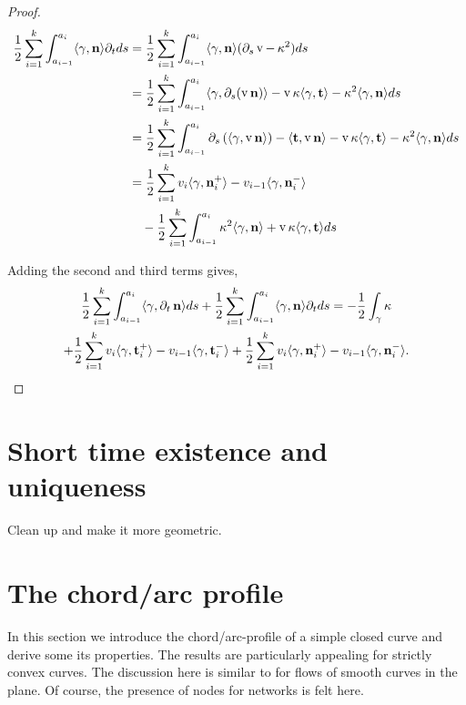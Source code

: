 \documentclass[11pt]{amsart}
\DeclareMathOperator{\tangspeed}{v}
\begin{document}
\begin{proof}
\[
\begin{split}
\frac{1}{2} \sum_{i=1}^k \int_{a_{i-1}}^{a_i} \ip{\gamma}{\nor} \partial_t ds &= \frac{1}{2} \sum_{i=1}^k \int_{a_{i-1}}^{a_i} \ip{\gamma}{\nor} (\partial_s \tangspeed - \curvecurv^2) ds \\
&= \frac{1}{2} \sum_{i=1}^k \int_{a_{i-1}}^{a_i} \ip{\gamma}{\partial_s (\tangspeed\nor)} - \tangspeed \curvecurv \ip{\gamma}{\tang} - \curvecurv^2 \ip{\gamma}{\nor} ds \\
&= \frac{1}{2} \sum_{i=1}^k \int_{a_{i-1}}^{a_i} \partial_s\left(\ip{\gamma}{\tangspeed\nor}\right) - \ip{\tang}{\tangspeed \nor} - \tangspeed \curvecurv \ip{\gamma}{\tang} - \curvecurv^2 \ip{\gamma}{\nor} ds \\
&= \frac{1}{2} \sum_{i=1}^k v_i \ip{\gamma}{\nor_i^+} - v_{i-1} \ip{\gamma}{\nor_i^-} \\
&\quad - \frac{1}{2} \sum_{i=1}^k \int_{a_{i-1}}^{a_i} \curvecurv^2 \ip{\gamma}{\nor} + \tangspeed \curvecurv \ip{\gamma}{\tang } ds
\end{split}
\]

Adding the second and third terms gives,
\begin{multline*}
\frac{1}{2} \sum_{i=1}^k \int_{a_{i-1}}^{a_i} \langle{\gamma},{\partial_t \operatorname{\mathbf{n}}}\rangle ds + \frac{1}{2} \sum_{i=1}^k \int_{a_{i-1}}^{a_i} \langle{\gamma},{\operatorname{\mathbf{n}}}\rangle \partial_t ds = - \frac{1}{2}\int_{\gamma} \operatorname{\kappa} \\
+ \frac{1}{2} \sum_{i=1}^k v_i \langle{\gamma},{\operatorname{\mathbf{t}}_i^+}\rangle - v_{i-1} \langle{\gamma},{\operatorname{\mathbf{t}}_i^-}\rangle + \frac{1}{2} \sum_{i=1}^k v_i \langle{\gamma},{\operatorname{\mathbf{n}}_i^+}\rangle - v_{i-1} \langle{\gamma},{\operatorname{\mathbf{n}}_i^-}\rangle.
\end{multline*}
\end{proof}

\section{Short time existence and uniqueness}
\label{sec:orgheadline6}
Clean up \cite{MR1240580} and make it more geometric.
\section{The chord/arc profile}
\label{sec:orgheadline10}

In this section we introduce the chord/arc-profile of a simple closed curve and derive some its properties. The results are particularly appealing for strictly convex curves. The discussion here is similar to \cite{alpha_csf_dist_comp} for flows of smooth curves in the plane. Of course, the presence of nodes for networks is felt here.
\end{document}
